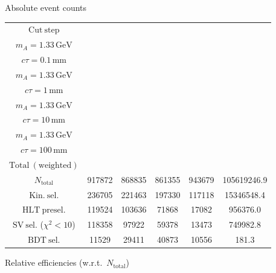 \documentclass[10pt,a4paper]{article}
\renewcommand{\arraystretch}{1.4}
\begin{document}
{\footnotesize\setlength{\tabcolsep}{4pt}\renewcommand{\arraystretch}{1.05}%
\vspace{12pt}

Absolute event counts

\begin{tabular}{cccccc}
\toprule
$\mathrm{Cut\ step}$ & \shortstack{$m_{\pi}=4\,\mathrm{GeV}$\\$m_{A}=1.33\,\mathrm{GeV}$\\$c\tau=0.1\,\mathrm{mm}$} & \shortstack{$m_{\pi}=4\,\mathrm{GeV}$\\$m_{A}=1.33\,\mathrm{GeV}$\\$c\tau=1\,\mathrm{mm}$} & \shortstack{$m_{\pi}=4\,\mathrm{GeV}$\\$m_{A}=1.33\,\mathrm{GeV}$\\$c\tau=10\,\mathrm{mm}$} & \shortstack{$m_{\pi}=4\,\mathrm{GeV}$\\$m_{A}=1.33\,\mathrm{GeV}$\\$c\tau=100\,\mathrm{mm}$} & \shortstack{$\mathrm{QCD}$\\$\mathrm{Total\ (weighted)}$} \\
\midrule
$N_{\mathrm{total}}$ & 917872 & 868835 & 861355 & 943679 & 105619246.9\\
$\mathrm{Kin.\ sel.}$ & 236705 & 221463 & 197330 & 117118 & 15346548.4\\
$\mathrm{HLT\ presel.}$ & 119524 & 103636 & 71868 & 17082 & 956376.0\\
$\mathrm{SV\ sel.}$ ($\chi^2{<}10$) & 118358 & 97922 & 59378 & 13473 & 749982.8\\
$\mathrm{BDT\ sel.}$ & 11529 & 29411 & 40873 & 10556 & 181.3\\
\bottomrule
\end{tabular}

\vspace{18pt}

Relative efficiencies (w.r.t.\ $N_{\mathrm{total}}$)

}
\end{document}
